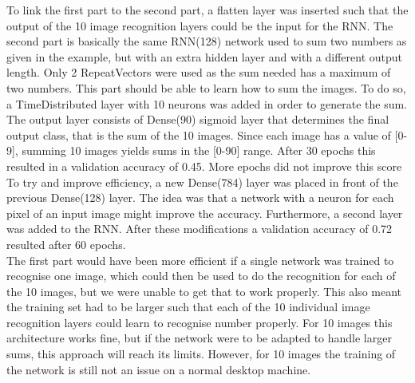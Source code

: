 \documentclass[a4paper,12pt]{article}
\begin{document}
To link the first part to the second part, a flatten layer was inserted such that the output of the 10 image recognition layers could be the input for the RNN. The second part is basically the same RNN(128) network used to sum two numbers as given in the example, but with an extra hidden layer and with a different output length. Only 2 RepeatVectors were used as the sum needed has a maximum of two numbers. This part should be able to learn how to sum the images. To do so, a TimeDistributed layer with 10 neurons was added in order to generate the sum. The output layer consists of Dense(90) sigmoid layer that determines the final output class, that is the sum of the 10 images. Since each image has a value of [0-9], summing 10 images yields sums in the [0-90] range.
After 30 epochs this resulted in a validation accuracy of 0.45. More epochs did not improve this score\\

To try and improve efficiency, a new Dense(784) layer was placed in front of the previous Dense(128) layer. The idea was that a network with a neuron for each pixel of an input image might improve the accuracy. Furthermore, a second layer was added to the RNN. After these modifications a validation accuracy of 0.72 resulted after 60 epochs.\\

The first part would have been more efficient if a single network was trained to recognise one image, which could then be used to do the recognition for each of the 10 images, but we were unable to get that to work properly. This also meant the training set had to be larger such that each of the 10 individual image recognition layers could learn to recognise number properly. For 10 images this architecture works fine, but if the network were to be adapted to handle larger sums, this approach will reach its limits. However, for 10 images the training of the network is still not an issue on a normal desktop machine.
\end{document}
